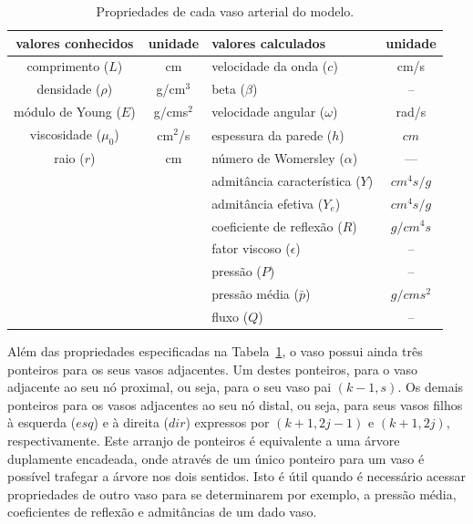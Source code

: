 \begin{table}[h]
	\begin{tabularx}{\textwidth}{c|c|X|c}
		\toprule
		\textbf{valores conhecidos} & \textbf{unidade} & \textbf{valores calculados} & \textbf{unidade} \\\midrule
		
		comprimento ($L$) & cm &  velocidade da onda ($c$) & cm/s \\
		
		densidade ($\rho$) & g/cm$^3$ &   beta ($\beta$) & -- \\
		
		módulo de Young ($E$) & g/cms$^2$  & velocidade angular ($\omega$) & rad/s \\
		
		viscosidade ($\mu_0$) & cm$^2$/s &	espessura da parede ($h$) &  $cm$ \\
		
		raio ($r$) & cm  & número de Womersley ($\alpha$) & --- \\
		
		& & admitância característica ($Y$) & $cm^4 s/g $\\
		
		&  & admitância efetiva ($Y_e$) & $cm^4 s/g $\\
		
		&  & coeficiente de reflexão ($R$) & $g /cm^4 s$ \\
		
		& & fator viscoso ($\epsilon$) & -- \\
		
		& & pressão ($P$) & -- \\
		
		&  &	pressão média ($\bar{p}$) & $g/cm s^2$ \\
		
		& &	fluxo ($Q$) & -- \\
		\hline
	\end{tabularx}
	\caption{Propriedades de cada vaso arterial do modelo.}
	\label{tab:info_vaso}
\end{table}

Além das propriedades especificadas na Tabela~\ref{tab:info_vaso}, o vaso possui ainda três ponteiros para os seus vasos adjacentes. Um destes ponteiros, para o vaso adjacente ao seu nó proximal, ou seja, para o seu vaso pai $(k-1,s)$. Os demais ponteiros para os vasos adjacentes ao seu nó distal, ou seja, para seus vasos filhos à esquerda ($esq$) e à direita ($dir$) expressos por $(k+1,2j-1)$ e $(k+1,2j)$, respectivamente. Este arranjo de ponteiros é equivalente a uma árvore duplamente encadeada, onde através de um único ponteiro para um vaso é possível trafegar a árvore nos dois sentidos. Isto é útil quando é necessário acessar propriedades de outro vaso para se determinarem por exemplo, a pressão média, coeficientes de reflexão e admitâncias de um dado vaso.

